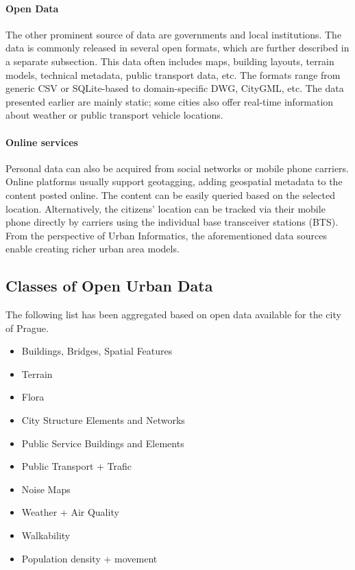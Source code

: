 \paragraph{Open Data}
The other prominent source of data are governments and local institutions. The data is commonly released in several open formats, which are further described in a separate subsection. This data often includes maps, building layouts, terrain models, technical metadata, public transport data, etc. The formats range from generic CSV or SQLite-based to domain-specific DWG, CityGML, etc.   
The data presented earlier are mainly static; some cities also offer real-time information about weather or public transport vehicle locations. 

\paragraph{Online services}
Personal data can also be acquired from social networks or mobile phone carriers. Online platforms usually support geotagging, adding geospatial metadata to the content posted online. The content can be easily queried based on the selected location. Alternatively, the citizens' location can be tracked via their mobile phone directly by carriers using the individual base transceiver stations (BTS).  From the perspective of Urban Informatics, the aforementioned data sources enable creating richer urban area models. 

\subsection{Classes of Open Urban Data}
The following list has been aggregated based on open data available for the city of Prague. 

\begin{itemize}
    \item Buildings, Bridges, Spatial Features
    \item Terrain
    \item Flora
    \item City Structure Elements and Networks
    \item Public Service Buildings and Elements
    \item Public Transport + Trafic
    \item Noise Maps
    \item Weather + Air Quality
    \item Walkability
    \item Population density + movement
\end{itemize}

